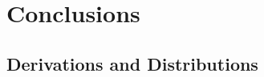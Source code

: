 \documentclass[letterpaper,11pt]{book}
\begin{document}


% 



\chapter{Conclusions}
\label{sec:Conclusions}




\acknowledgments


\appendix



\section{Derivations and Distributions}




\end{document}
